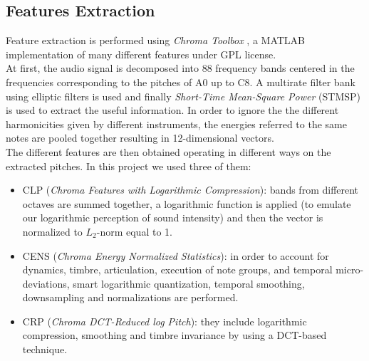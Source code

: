 \subsection{Features Extraction}
\label{subsec:features}

Feature extraction is performed using \textit{Chroma Toolbox} \cite{ChromaToolbox}, a MATLAB implementation of many different features under GPL license.\\
%
At first, the audio signal is decomposed into 88 frequency bands centered in the frequencies corresponding to the pitches of A0 up to C8. A multirate filter bank using elliptic filters is used and finally \textit{Short-Time Mean-Square Power} (STMSP) is used to extract the useful information. In order to ignore the the different harmonicities given by different instruments, the energies referred to the same notes are pooled together resulting in 12-dimensional vectors.\\
%
The different features are then obtained operating in different ways on the extracted pitches. In this project we used three of them:
\begin{itemize}
	\item CLP (\textit{Chroma Features with Logarithmic Compression}): bands from different octaves are summed together, a logarithmic function is applied (to emulate our logarithmic perception of sound intensity) and then the vector is normalized to $L_2$-norm equal to 1.
	\item CENS (\textit{Chroma Energy Normalized Statistics}): in order to account for dynamics, timbre, articulation, execution of note groups, and temporal micro-deviations, smart logarithmic quantization, temporal smoothing, downsampling and normalizations are performed.
	\item CRP (\textit{Chroma DCT-Reduced log Pitch}): they include logarithmic compression, smoothing and timbre invariance by using a DCT-based technique.
\end{itemize}

